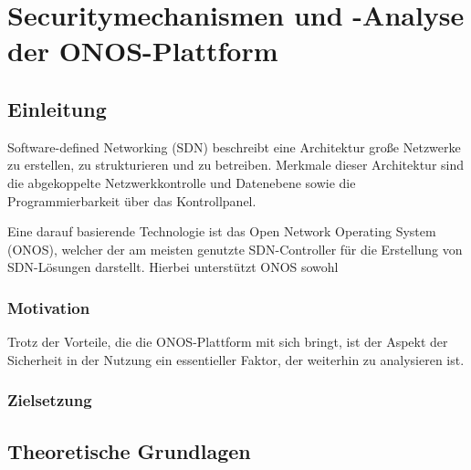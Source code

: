 \chapter{Securitymechanismen und -Analyse der ONOS-Plattform}


\newpage



\section{Einleitung}
Software-defined Networking (SDN) beschreibt eine Architektur große Netzwerke zu erstellen, zu strukturieren und zu betreiben. Merkmale dieser Architektur sind die abgekoppelte Netzwerkkontrolle und Datenebene sowie die Programmierbarkeit über das Kontrollpanel.~\cite{Xia_a_survery_on_sdn_2015}

Eine darauf basierende Technologie ist das Open Network Operating System (ONOS), welcher der am meisten genutzte SDN-Controller für die Erstellung von SDN-Lösungen darstellt. Hierbei unterstützt ONOS sowohl  ~\cite{opennetworkingOpenNetwork}

\subsection{Motivation}

Trotz der Vorteile, die die ONOS-Plattform mit sich bringt, ist der Aspekt der Sicherheit in der Nutzung ein essentieller Faktor, der weiterhin zu analysieren ist. 
\subsection{Zielsetzung}

\newpage

\section{Theoretische Grundlagen}

